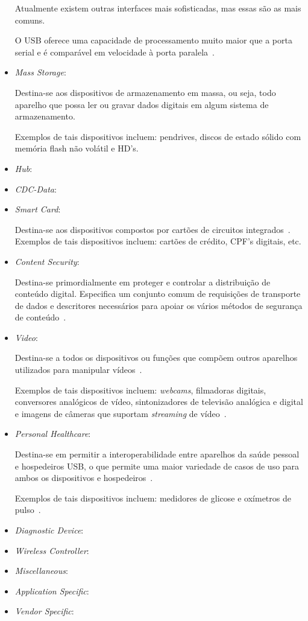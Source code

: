 \begin{itemize}
	Atualmente existem outras interfaces mais sofisticadas, mas essas são as mais comuns.

	O USB oferece uma capacidade de processamento muito maior que a porta serial e é comparável em velocidade à porta paralela~\cite{usbprintclass}.
	\item \emph{Mass Storage}: 

	Destina-se aos dispositivos de armazenamento em massa, ou seja, todo aparelho que possa ler ou gravar dados digitais em algum sistema de armazenamento.

	Exemplos de tais dispositivos incluem: pendrives, discos de estado sólido com memória flash não volátil e HD's.
	\item \emph{Hub}: 
	\item \emph{CDC-Data}: 
	\item \emph{Smart Card}: 

	Destina-se aos dispositivos compostos por cartões de circuitos integrados~\cite{usbsmartcard}.
	Exemplos de tais dispositivos incluem: cartões de crédito, CPF's digitais, etc.
	\item \emph{Content Security}: 

	Destina-se primordialmente em proteger e controlar a distribuição de conteúdo digital. Especifica um conjunto comum de requisições de transporte de dados e descritores necessários para apoiar os vários métodos de segurança de conteúdo~\cite{usbcontentsecurityclass}.
	\item \emph{Video}: 

	Destina-se a todos os dispositivos ou funções que compõem outros aparelhos utilizados para manipular vídeos~\cite{usbvideoclass}.

	Exemplos de tais dispositivos incluem: \emph{webcams}, filmadoras digitais, conversores analógicos de vídeo, sintonizadores de televisão analógica e digital e imagens de câmeras que suportam \emph{streaming} de vídeo~\cite{usbvideoclass}.
	\item \emph{Personal Healthcare}: 

	Destina-se em permitir a interoperabilidade entre aparelhos da saúde pessoal e hospedeiros USB, o que permite uma maior variedade de casos de uso para ambos os dispositivos e hospedeiros~\cite{usbhealthcareclass}.

	Exemplos de tais dispositivos incluem: medidores de glicose e oxímetros de pulso~\cite{usbhealthcareclass}.
	\item \emph{Diagnostic Device}: 
	\item \emph{Wireless Controller}: 
	\item \emph{Miscellaneous}: 
	\item \emph{Application Specific}: 
	\item \emph{Vendor Specific}: 
\end{itemize}
